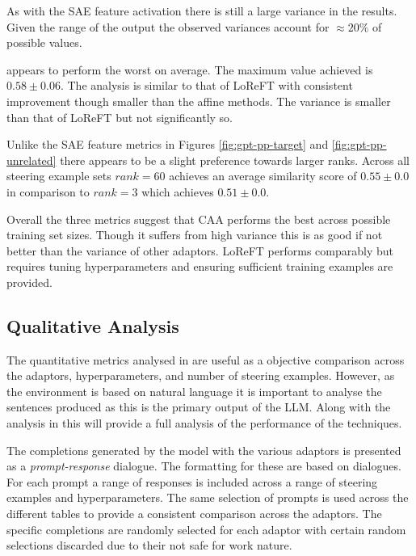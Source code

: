 As with the SAE feature activation there is still a large variance in the results.
Given the range of the output the observed variances account for $\approx 20\%$ of possible values.

 appears to perform the worst on average.
The maximum value achieved is $0.58 \pm 0.06$.
The analysis is similar to that of LoReFT with consistent improvement though smaller than the affine methods.
The variance is smaller than that of LoReFT but not significantly so.

Unlike the SAE feature metrics in Figures \ref{fig:gpt-pp-target} and \ref{fig:gpt-pp-unrelated} there appears to be a slight preference towards larger ranks.
Across all steering example sets $rank = 60$ achieves an average similarity score of $0.55 \pm 0.0$ in comparison to $rank = 3$ which achieves $0.51 \pm 0.0$.

Overall the three metrics suggest that CAA performs the best across possible training set sizes.
Though it suffers from high variance this is as good if not better than the variance of other adaptors.
LoReFT performs comparably but requires tuning hyperparameters and ensuring sufficient training examples are provided.

\subsection{Qualitative Analysis}
\label{sec:qual}

The quantitative metrics analysed in  are useful as a objective comparison across the adaptors, hyperparameters, and number of steering examples.
However, as the environment is based on natural language it is important to analyse the sentences produced as this is the primary output of the LLM.
Along with the analysis in  this will provide a full analysis of the performance of the techniques.

The completions generated by the model with the various adaptors is presented as a \emph{prompt-response} dialogue.
The formatting for these are based on \cites{mwe} dialogues.
For each prompt a range of responses is included across a range of steering examples and hyperparameters.
The same selection of prompts is used across the different tables to provide a consistent comparison across the adaptors.
The specific completions are randomly selected for each adaptor with certain random selections discarded due to their not safe for work nature.



